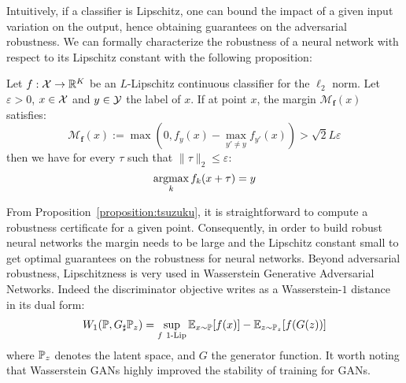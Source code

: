 Intuitively, if a classifier is Lipschitz, one can bound the impact of a given input variation on the output, hence obtaining guarantees on the adversarial robustness.
We can formally characterize the robustness of a neural network with respect to its Lipschitz constant with the following proposition:
\begin{prop} \label{proposition:tsuzuku}
Let $f:\mathcal{X}\to\mathbb{R}^K$ be an $L$-Lipschitz continuous classifier for the $\ell_2$ norm.
Let $\varepsilon > 0$, $x \in \mathcal{X}$ and $y \in \mathcal{Y}$ the label of $x$.
If at point $x$, the margin $\mathcal{M}_{\mathbf{f}}(x)$ satisfies:
\begin{equation*}
  \mathcal{M}_{\mathbf{f}}(x):=\max(0,f_y(x)-\max_{y'\neq y}f_{y'}(x)) > \sqrt{2} L \varepsilon
\end{equation*}
then we have for every $\tau$ such that $\lVert \tau \rVert_2 \leq \varepsilon$:
\begin{equation*}
  \operatorname*{argmax}_{k}f_k(x + \tau) = y
\end{equation*}
\end{prop}
From Proposition~\ref{proposition:tsuzuku}, it is straightforward to compute a robustness certificate for a given point.
Consequently, in order to build robust neural networks the margin needs to be large and the Lipschitz constant small to get optimal guarantees on the robustness for neural networks. Beyond adversarial robustness, Lipschitzness is very used in Wasserstein Generative Adversarial Networks. Indeed the discriminator objective writes as a Wasserstein-$1$ distance in its dual form:
\begin{align*}
  W_1(\mathbb{P},G_\sharp \mathbb{P}_z) = \sup_{f~1\text{-Lip}}\mathbb{E}_{x\sim\mathbb{P}}[f(x)] -\mathbb{E}_{z\sim\mathbb{P}_z}[f(G(z))]
\end{align*}
where $\mathbb{P}_z$ denotes the latent space, and $G$ the generator function. It worth noting that Wasserstein GANs highly improved the stability of training for GANs. 
